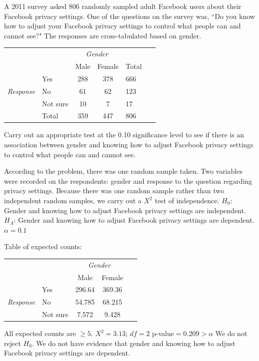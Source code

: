 \begin{example}{A 2011 survey asked 806 randomly sampled adult Facebook users about their Facebook privacy settings. One of the questions on the survey was, ``Do you know how to adjust your Facebook privacy settings to control what people can and cannot see?" The responses are cross-tabulated based on gender. 
\label{facebookprivacy}
\begin{center}
\begin{tabular}{l l c c ll}
								&			& \multicolumn{2}{c}{\textit{Gender}}	& &\hspace{10mm}\ 		\\
\cline{3-4}
								&			& Male		& Female		& Total	\\
\cline{2-5}
								& Yes		& 288		& 378		& 666	\\
\textit{Response}					& No			& 61			& 62 			& 123	\\
								& Not sure	& 10			& 7 			& 17	\\
\cline{2-5}
								& Total		& 359		& 447		& 806
\end{tabular}
\end{center}
Carry out an appropriate test at the 0.10 significance level to see if there is an association between gender and knowing how to adjust Facebook privacy settings to control what people can and cannot see.}
According to the problem, there was one random sample taken. Two variables were recorded on the respondents: gender and response to the question regarding privacy settings. Because there was one random sample rather than two independent random samples, we carry out a  $X^2$ test of independence.
\newline $H_0$: Gender and knowing how to adjust Facebook privacy settings are independent.
\newline $H_A$: Gender and knowing how to adjust Facebook privacy settings are dependent.
 $\alpha=0.1$
 
Table of expected counts:\textA{\vspace{-4mm}}
\begin{center}
\begin{tabular}{l l c c l}
								&			& \multicolumn{2}{c}{\textit{Gender}}	&\hspace{17mm}\ 		\\
\cline{3-4}
								&			& Male		& Female	\\
\cline{2-4}
								& Yes		& 296.64		& 369.36	\\
\textit{Response}					& No			& 54.785		& 68.215	\\
								& Not sure	& 7.572		& 9.428	\\
\cline{2-4}
\end{tabular}
\end{center}
All expected counts are $\ge 5$.
 $X^2 = 3.13$; $df = 2$
 p-value$ = 0.209 > \alpha$
We do not reject $H_0$. We do not have evidence that gender and knowing how to adjust Facebook privacy settings are dependent.
\end{example}


